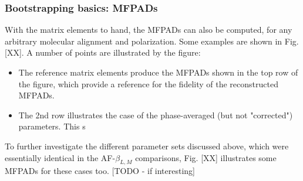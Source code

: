 \subsubsection{Bootstrapping basics: MFPADs}

With the matrix elements to hand, the MFPADs can also be computed, for any arbitrary molecular alignment and polarization. Some examples are shown in Fig. [XX]. A number of points are illustrated by the figure:

\begin{itemize}
\item The reference matrix elements produce the MFPADs shown in the top row of the figure, which provide a reference for the fidelity of the reconstructed MFPADs.
\item The 2nd row illustrates the case of the phase-averaged (but not "corrected") parameters. This s
\end{itemize}

To further investigate the different parameter sets discussed above, which were essentially identical in the AF-$\beta_{L,M}$ comparisons, Fig. [XX] illustrates some MFPADs for these cases too. [TODO - if interesting]